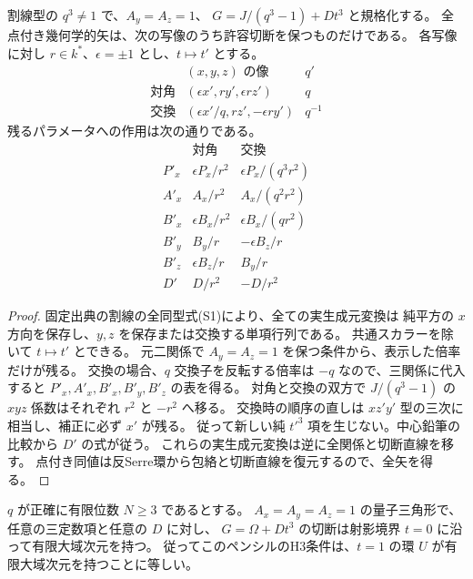 \begin{proposition}\label{prop:cubic-CY-three-alpha-secant-arrows}
割線型の $q^3\ne1$ で、$A_y=A_z=1$、
$G=J/(q^3-1)+Dt^3$ と規格化する。
全点付き幾何学的矢は、次の写像のうち許容切断を保つものだけである。
各写像に対し $r\in k^*$、$\epsilon=\pm1$ とし、$t\mapsto t'$ とする。
\[
\begin{array}{c|c|c}
 & (x,y,z)\text{ の像} & q'\\ \hline
 \text{対角} & (\epsilon x', r y',\epsilon r z') & q\\
 \text{交換} & (\epsilon x'/q, r z',-\epsilon r y') & q^{-1}
\end{array}
\]
残るパラメータへの作用は次の通りである。
\[
\begin{array}{c|cc}
 & \text{対角} & \text{交換}\\ \hline
 P'_x & \epsilon P_x/r^2 & \epsilon P_x/(q^3r^2)\\
 A'_x & A_x/r^2 & A_x/(q^2 r^2)\\
 B'_x & \epsilon B_x/r^2 & \epsilon B_x/(q r^2)\\
 B'_y & B_y/r & -\epsilon B_z/r\\
 B'_z & \epsilon B_z/r & B_y/r\\
 D'   & D/r^2 & -D/r^2
\end{array}
\]
\end{proposition}
\begin{proof}
固定出典の割線の全同型式(S1)により、全ての実生成元変換は
純平方の $x$ 方向を保存し、$y,z$ を保存または交換する単項行列である。
共通スカラーを除いて $t\mapsto t'$ とできる。
元二関係で $A_y=A_z=1$ を保つ条件から、表示した倍率だけが残る。
交換の場合、$q$ 交換子を反転する倍率は $-q$ なので、三関係に代入すると
$P'_x,A'_x,B'_x,B'_y,B'_z$ の表を得る。
対角と交換の双方で $J/(q^3-1)$ の $xyz$ 係数はそれぞれ $r^2$ と $-r^2$ へ移る。
交換時の順序の直しは $xz'y'$ 型の三次に相当し、補正に必ず $x'$ が残る。
従って新しい純 $t'^3$ 項を生じない。中心鉛筆の比較から $D'$ の式が従う。
これらの実生成元変換は逆に全関係と切断直線を移す。
点付き同値は反Serre環から包絡と切断直線を復元するので、全矢を得る。
\end{proof}
\begin{theorem}\label{thm:cubic-CY-three-alpha-triangle-finite-boundary}
$q$ が正確に有限位数 $N\ge3$ であるとする。
$A_x=A_y=A_z=1$ の量子三角形で、任意の三定数項と任意の $D$ に対し、
$G=\Omega+Dt^3$ の切断は射影境界 $t=0$ に沿って有限大域次元を持つ。
従ってこのペンシルのH3条件は、$t=1$ の環 $U$ が有限大域次元を持つことに等しい。
\end{theorem}
